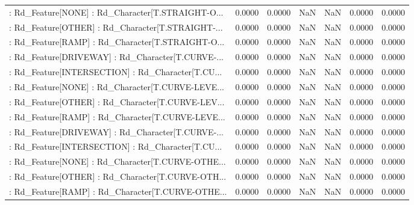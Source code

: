 \begin{longtable}{p{4cm}cccccc}
 : Rd\_Feature[NONE] : Rd\_Character[T.STRAIGHT-O... &            0.0000 &            0.0000 &     NaN &          NaN &             0.0000 &            0.0000 \\
 : Rd\_Feature[OTHER] : Rd\_Character[T.STRAIGHT-... &            0.0000 &            0.0000 &     NaN &          NaN &             0.0000 &            0.0000 \\
 : Rd\_Feature[RAMP] : Rd\_Character[T.STRAIGHT-O... &            0.0000 &            0.0000 &     NaN &          NaN &             0.0000 &            0.0000 \\
 : Rd\_Feature[DRIVEWAY] : Rd\_Character[T.CURVE-... &            0.0000 &            0.0000 &     NaN &          NaN &             0.0000 &            0.0000 \\
 : Rd\_Feature[INTERSECTION] : Rd\_Character[T.CU... &            0.0000 &            0.0000 &     NaN &          NaN &             0.0000 &            0.0000 \\
 : Rd\_Feature[NONE] : Rd\_Character[T.CURVE-LEVE... &            0.0000 &            0.0000 &     NaN &          NaN &             0.0000 &            0.0000 \\
 : Rd\_Feature[OTHER] : Rd\_Character[T.CURVE-LEV... &            0.0000 &            0.0000 &     NaN &          NaN &             0.0000 &            0.0000 \\
 : Rd\_Feature[RAMP] : Rd\_Character[T.CURVE-LEVE... &            0.0000 &            0.0000 &     NaN &          NaN &             0.0000 &            0.0000 \\
 : Rd\_Feature[DRIVEWAY] : Rd\_Character[T.CURVE-... &            0.0000 &            0.0000 &     NaN &          NaN &             0.0000 &            0.0000 \\
 : Rd\_Feature[INTERSECTION] : Rd\_Character[T.CU... &            0.0000 &            0.0000 &     NaN &          NaN &             0.0000 &            0.0000 \\
 : Rd\_Feature[NONE] : Rd\_Character[T.CURVE-OTHE... &            0.0000 &            0.0000 &     NaN &          NaN &             0.0000 &            0.0000 \\
 : Rd\_Feature[OTHER] : Rd\_Character[T.CURVE-OTH... &            0.0000 &            0.0000 &     NaN &          NaN &             0.0000 &            0.0000 \\
 : Rd\_Feature[RAMP] : Rd\_Character[T.CURVE-OTHE... &            0.0000 &            0.0000 &     NaN &          NaN &             0.0000 &            0.0000 \\

\end{longtable}
